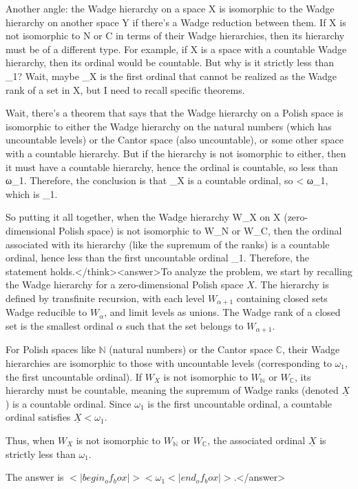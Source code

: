 Another angle: the Wadge hierarchy on a space X is isomorphic to the Wadge hierarchy on another space Y if there's a Wadge reduction between them. If X is not isomorphic to N or C in terms of their Wadge hierarchies, then its hierarchy must be of a different type. For example, if X is a space with a countable Wadge hierarchy, then its ordinal would be countable. But why is it strictly less than _1? Wait, maybe _X is the first ordinal that cannot be realized as the Wadge rank of a set in X, but I need to recall specific theorems. 

Wait, there's a theorem that says that the Wadge hierarchy on a Polish space is isomorphic to either the Wadge hierarchy on the natural numbers (which has uncountable levels) or the Cantor space (also uncountable), or some other space with a countable hierarchy. But if the hierarchy is not isomorphic to either, then it must have a countable hierarchy, hence the ordinal is countable, so less than ω_1. Therefore, the conclusion is that _X is a countable ordinal, so < ω_1, which is _1. 

So putting it all together, when the Wadge hierarchy W_X on X (zero-dimensional Polish space) is not isomorphic to W_N or W_C, then the ordinal associated with its hierarchy (like the supremum of the ranks) is a countable ordinal, hence less than the first uncountable ordinal _1. Therefore, the statement holds.</think><answer>To analyze the problem, we start by recalling the Wadge hierarchy for a zero-dimensional Polish space \( X \). The hierarchy is defined by transfinite recursion, with each level \( W_{\alpha+1} \) containing closed sets Wadge reducible to \( W_\alpha \), and limit levels as unions. The Wadge rank of a closed set is the smallest ordinal \( \alpha \) such that the set belongs to \( W_{\alpha+1} \).  

For Polish spaces like \( \mathbb{N} \) (natural numbers) or the Cantor space \( \mathbb{C} \), their Wadge hierarchies are isomorphic to those with uncountable levels (corresponding to \( \omega_1 \), the first uncountable ordinal). If \( W_X \) is not isomorphic to \( W_\mathbb{N} \) or \( W_\mathbb{C} \), its hierarchy must be countable, meaning the supremum of Wadge ranks (denoted \( \underline{X} \)) is a countable ordinal. Since \( \omega_1 \) is the first uncountable ordinal, a countable ordinal satisfies \( \underline{X} < \omega_1 \).  

Thus, when \( W_X \) is not isomorphic to \( W_\mathbb{N} \) or \( W_\mathbb{C} \), the associated ordinal \( \underline{X} \) is strictly less than \( \omega_1 \).  

The answer is \(<|begin_of_box|>< \omega_1<|end_of_box|>\).</answer>